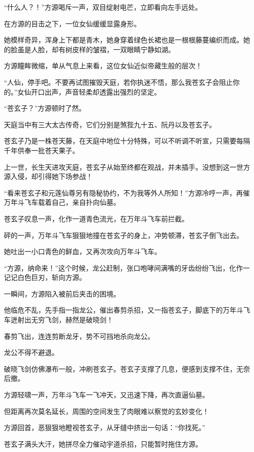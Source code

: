 \begin{this_body}
“什么人？！”方源喝斥一声，双目绽射电芒，立即看向左手远处。

在方源的目击之下，一位女仙缓缓显露身形。

她模样奇异，浑身上下都是青木，她身穿着绿色长裙也是一根根藤蔓编织而成。她的脸虽是人脸，却有树皮样的皱褶，一双眼睛宁静如湖。

方源瞳眸微缩，单从气息上来看，这位女仙近似帝藏生般的层次！

“人仙，停手吧。不要再试图摧毁天庭，若你执迷不悟，那么我苍玄子会阻止你的。”女仙开口出声，声音轻柔却透露出强烈的坚定。

“苍玄子？”方源顿时了然。

天庭当中有三大太古传奇，它们分别是煞狴九十五、阮丹以及苍玄子。

苍玄子乃是一株苍天藤，在天庭中地位十分特殊，可以不听调不听宣，只需要每隔千年供奉一批苍天果子。

上一世，长生天进攻天庭，苍玄子从始至终都在观战，并未插手。没想到这一世方源入侵，却引得她下场参战！

“看来苍玄子和元莲仙尊另有隐秘协约，不为我等外人所知！”方源冷哼一声，再催万年斗飞车载着自己，亲自扑向仙墓。

苍玄子叹息一声，化作一道青色流光，在万年斗飞车前拦截。

砰的一声，万年斗飞车狠狠地撞在苍玄子的身上，冲势顿滞，苍玄子倒飞出去。

她吐出一小口青色的鲜血，又再次攻向万年斗飞车。

“方源，纳命来！”这个时候，龙公赶制，张口咆哮间满嘴的牙齿纷纷飞出，化作一记记白色巨刃，斩向方源。

一瞬间，方源陷入被前后夹击的困境。

他临危不乱，先手指一指龙公，催出春剪杀招，又一指苍玄子，脚底下的万年斗飞车迸射出无穷飞剑，赫然是破晓剑！

春剪飞出，连连剪断龙牙，势不可挡地杀向龙公。

龙公不得不避退。

破晓飞剑仿佛瀑布一般，冲刷苍玄子。苍玄子支撑了几息，便感到支撑不住，无奈后撤。

方源轻啸一声，万年斗飞车一飞冲天，又迅速下降，再次直逼仙墓。

但距离再次莫名延长，周围的空间发生了肉眼难以察觉的玄妙变化！

方源回首，恶狠狠地瞪视苍玄子，从牙缝中挤出一句话：“你找死。”

苍玄子满头大汗，她拼尽全力催动宇道杀招，只能暂时拖住方源。


\end{this_body}
